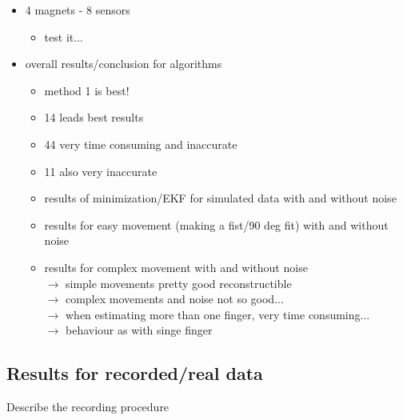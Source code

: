 \begin{itemize}
\item 4 magnets - 8 sensors
	\begin{itemize}
	\item test it...
	\end{itemize}	
	
\item overall results/conclusion for algorithms
	\begin{itemize}
	\item method 1 is best!
	\item 14 leads best results
	\item 44 very time consuming and inaccurate
	\item 11 also very inaccurate
	\end{itemize}	
		
\begin{itemize}
\item results of minimization/EKF for simulated data with and without noise
\item results for easy movement (making a fist/90 deg fit) with and without noise
\item results for complex movement with and without noise \\
		$ \rightarrow $ simple movements pretty good reconstructible\\
		$ \rightarrow $	complex movements and noise not so good...\\
		$ \rightarrow $ when estimating more than one finger, very time consuming...\\
		$ \rightarrow $	behaviour as with singe finger
\end{itemize}

\end{itemize}



\subsection{Results for recorded/real data} \label{subsec:resMeas}

Describe the recording procedure

